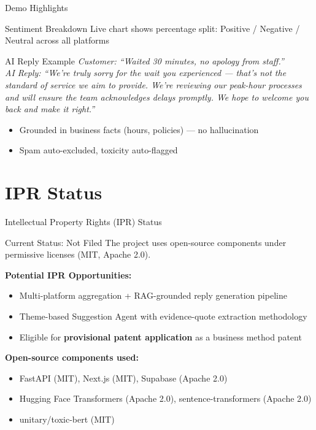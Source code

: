 \documentclass[aspectratio=169]{beamer}
\begin{document}
\begin{frame}{Demo Highlights}
  \begin{block}{Sentiment Breakdown}
    Live chart shows percentage split: Positive / Negative / Neutral across all platforms
  \end{block}
  \vspace{0.3cm}
  \begin{block}{AI Reply Example}
    \small\textit{Customer: ``Waited 30 minutes, no apology from staff.''}\\
    \textit{AI Reply: ``We're truly sorry for the wait you experienced — that's not the standard of service we aim to provide. We're reviewing our peak-hour processes and will ensure the team acknowledges delays promptly. We hope to welcome you back and make it right.''}
  \end{block}
  \vspace{0.2cm}
  \begin{itemize}
    \small
    \item Grounded in business facts (hours, policies) — no hallucination
    \item Spam auto-excluded, toxicity auto-flagged
  \end{itemize}
\end{frame}

\section{IPR Status}

\begin{frame}{Intellectual Property Rights (IPR) Status}
  \begin{block}{Current Status: Not Filed}
    The project uses open-source components under permissive licenses (MIT, Apache 2.0).
  \end{block}
  \vspace{0.3cm}
  \textbf{Potential IPR Opportunities:}
  \begin{itemize}
    \item Multi-platform aggregation + RAG-grounded reply generation pipeline
    \item Theme-based Suggestion Agent with evidence-quote extraction methodology
    \item Eligible for \textbf{provisional patent application} as a business method patent
  \end{itemize}
  \vspace{0.3cm}
  \textbf{Open-source components used:}
  \begin{itemize}
    \small
    \item FastAPI (MIT), Next.js (MIT), Supabase (Apache 2.0)
    \item Hugging Face Transformers (Apache 2.0), sentence-transformers (Apache 2.0)
    \item unitary/toxic-bert (MIT)
  \end{itemize}
\end{frame}
\end{document}
